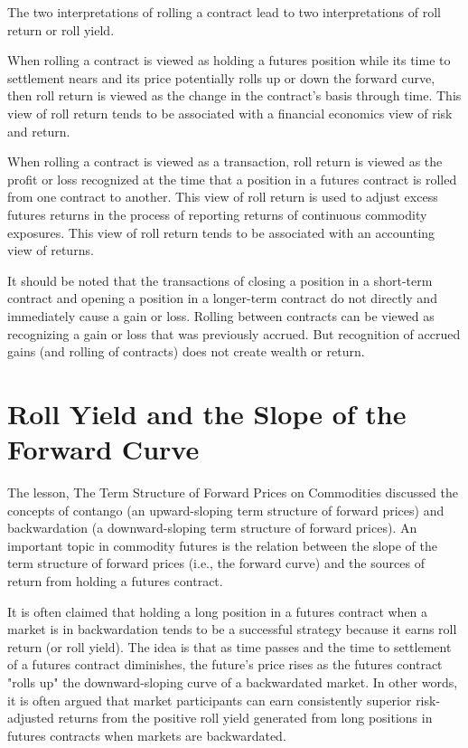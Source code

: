 \documentclass[11pt]{article}
\begin{document}
The two interpretations of rolling a contract lead to two interpretations of roll return or roll yield.

When rolling a contract is viewed as holding a futures position while its time to settlement nears and its price potentially rolls up or down the forward curve, then roll return is viewed as the change in the contract's basis through time. This view of roll return tends to be associated with a financial economics view of risk and return.

When rolling a contract is viewed as a transaction, roll return is viewed as the profit or loss recognized at the time that a position in a futures contract is rolled from one contract to another. This view of roll return is used to adjust excess futures returns in the process of reporting returns of continuous commodity exposures. This view of roll return tends to be associated with an accounting view of returns.

It should be noted that the transactions of closing a position in a short-term contract and opening a position in a longer-term contract do not directly and immediately cause a gain or loss. Rolling between contracts can be viewed as recognizing a gain or loss that was previously accrued. But recognition of accrued gains (and rolling of contracts) does not create wealth or return.

\section*{Roll Yield and the Slope of the Forward Curve}
The lesson, The Term Structure of Forward Prices on Commodities discussed the concepts of contango (an upward-sloping term structure of forward prices) and backwardation (a downward-sloping term structure of forward prices). An important topic in commodity futures is the relation between the slope of the term structure of forward prices (i.e., the forward curve) and the sources of return from holding a futures contract.

It is often claimed that holding a long position in a futures contract when a market is in backwardation tends to be a successful strategy because it earns roll return (or roll yield). The idea is that as time passes and the time to settlement of a futures contract diminishes, the future's price rises as the futures contract "rolls up" the downward-sloping curve of a backwardated market. In other words, it is often argued that market participants can earn consistently superior risk-adjusted returns from the positive roll yield generated from long positions in futures contracts when markets are backwardated.
\end{document}
